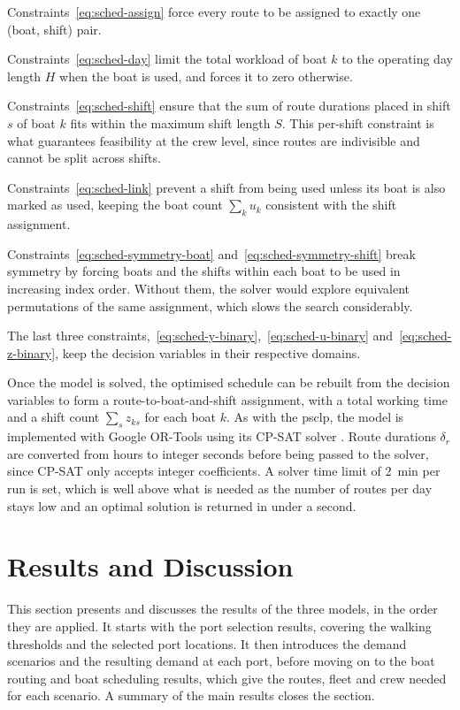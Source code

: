 \documentclass[12pt]{article}
\begin{document}
Constraints~\eqref{eq:sched-assign} force every route to be assigned to exactly one (boat, shift) pair.

Constraints~\eqref{eq:sched-day} limit the total workload of boat \(k\) to the operating day length \(H\) when the boat is used, and forces it to zero otherwise.

Constraints~\eqref{eq:sched-shift} ensure that the sum of route durations placed in shift \(s\) of boat \(k\) fits within the maximum shift length \(S\). This per-shift constraint is what guarantees feasibility at the crew level, since routes are indivisible and cannot be split across shifts.

Constraints~\eqref{eq:sched-link} prevent a shift from being used unless its boat is also marked as used, keeping the boat count \(\sum_k u_k\) consistent with the shift assignment.

Constraints~\eqref{eq:sched-symmetry-boat} and~\eqref{eq:sched-symmetry-shift} break symmetry by forcing boats and the shifts within each boat to be used in increasing index order. Without them, the solver would explore equivalent permutations of the same assignment, which slows the search considerably.

The last three constraints,~\eqref{eq:sched-y-binary},~\eqref{eq:sched-u-binary} and~\eqref{eq:sched-z-binary}, keep the decision variables in their respective domains.

Once the model is solved, the optimised schedule can be rebuilt from the decision variables to form a route-to-boat-and-shift assignment, with a total working time and a shift count \(\sum_s z_{ks}\) for each boat \(k\). As with the \ac{psclp}, the model is implemented with Google OR-Tools \parencite{ortools} using its CP-SAT solver \parencite{cpsat}. Route durations \(\delta_r\) are converted from hours to integer seconds before being passed to the solver, since CP-SAT only accepts integer coefficients. A solver time limit of \qty{2}{\minute} per run is set, which is well above what is needed as the number of routes per day stays low and an optimal solution is returned in under a second.

\section{Results and Discussion}
\label{sec:results-and-discussion}

This section presents and discusses the results of the three models, in the order they are applied. It starts with the port selection results, covering the walking thresholds and the selected port locations. It then introduces the demand scenarios and the resulting demand at each port, before moving on to the boat routing and boat scheduling results, which give the routes, fleet and crew needed for each scenario. A summary of the main results closes the section.
\end{document}

